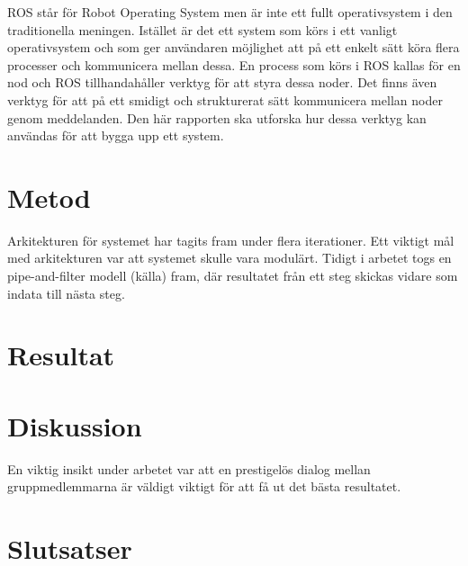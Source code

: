 ROS står för Robot Operating System men är inte ett fullt operativsystem i den traditionella meningen. Istället är det ett system som körs i ett vanligt operativsystem och som ger användaren möjlighet att på ett enkelt sätt köra flera processer och kommunicera mellan dessa. En process som körs i ROS kallas för en nod och ROS tillhandahåller verktyg för att styra dessa noder. Det finns även verktyg för att på ett smidigt och strukturerat sätt kommunicera mellan noder genom meddelanden. Den här rapporten ska utforska hur dessa verktyg kan användas för att bygga upp ett system.

\cite{quigley2009ros}

\section{Metod}
\label{sec:method-lundberg}

Arkitekturen för systemet har tagits fram under flera iterationer. Ett viktigt mål med arkitekturen var att systemet skulle vara modulärt. Tidigt i arbetet togs en pipe-and-filter modell (källa) fram, där resultatet från ett steg skickas vidare som indata till nästa steg. 



\section{Resultat}
\label{sec:results-lundberg}


\section{Diskussion}
\label{sec:discussion-lundberg}

En viktig insikt under arbetet var att en prestigelös dialog mellan gruppmedlemmarna är väldigt viktigt för att få ut det bästa resultatet.

\section{Slutsatser}
\label{sec:conclusions-lundberg}


